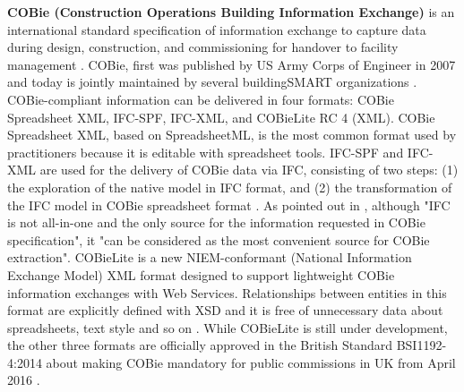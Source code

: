 \textbf{COBie (Construction Operations Building Information Exchange)} is an international standard specification of information exchange to capture data during design, construction, and commissioning for handover to facility management \cite{bentley2013cobie, east2007construction}.
COBie, first was published by US Army Corps of Engineer in 2007 and today is jointly maintained by several buildingSMART organizations \cite{day2014problem, karlshoj2016delivering}.
COBie-compliant information can be delivered in four formats: COBie Spreadsheet XML, IFC-SPF, IFC-XML, and COBieLite RC 4 (XML).
COBie Spreadsheet XML, based on SpreadsheetML, is the most common format used by practitioners because it is editable with spreadsheet tools.
IFC-SPF and IFC-XML are used for the delivery of COBie data via IFC, consisting of two steps: (1) the exploration of the native model in IFC format, and (2) the transformation of the IFC model in COBie spreadsheet format \cite{karlshoj2016delivering}. 
As pointed out in \cite{yalcinkaya2015examining}, although "IFC is not all-in-one and the only source for the information requested in COBie specification", it "can be considered as the most convenient source for COBie extraction".
COBieLite is a new NIEM-conformant (National Information Exchange Model) XML format designed to support lightweight COBie information exchanges with Web Services.
Relationships between entities in this format are explicitly defined with XSD and it is free of unnecessary data about spreadsheets, text style and so on \cite{bogen2015cobielite}.
While COBieLite is still under development, the other three formats are officially approved in the British Standard BSI1192-4:2014 about making COBie mandatory for public commissions in UK from April 2016 \cite{karlshoj2016delivering}.



